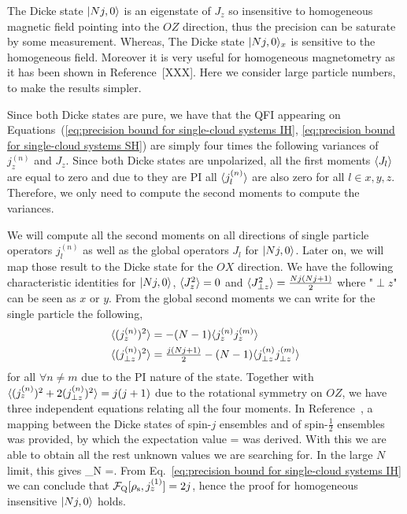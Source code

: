 The Dicke state $\vert Nj, 0 \rangle$ is an eigenstate of $J_z$ so insensitive to homogeneous magnetic field pointing into the $OZ$ direction, thus the precision can be saturate by some measurement.
Whereas, The Dicke state $\vert Nj, 0 \rangle_x$ is sensitive to the homogeneous field.
Moreover it is very useful for homogeneous magnetometry as it has been shown in Reference~[XXX].
Here we consider large particle numbers, to make the results simpler.

Since both Dicke states are pure, we have that
the QFI appearing on Equations~(\ref{eq:precision bound for single-cloud
systems IH}, \ref{eq:precision bound for single-cloud
systems SH}) are simply four times the following variances of $j_z^{(n)}$ and $J_z$.
Since both Dicke states are unpolarized, all the first moments $\langle J_l \rangle$ are equal to zero and due to they are PI all $\langle j_l^{(n)} \rangle$ are also zero for all $l\in x,y,z$.
Therefore, we only need to compute the second moments to compute the variances.


We will compute all the second moments on all directions of single particle operators $j_l^{(n)}$ as well as the global operators $J_l$ for $\vert Nj,0 \rangle$.
Later on, we will map those result to the Dicke state for the $OX$ direction.
We have the following characteristic identities for $\vert Nj,0 \rangle$, $\langle J_z^2 \rangle = 0$ and $\langle J_{\perp z}^2 \rangle = \frac{Nj(Nj+1)}{2}$ where "${\perp}{z}$" can be seen as $x$ or $y$.
From the global second moments we can write for the single particle the following,
\begin{align}
  \langle (j_z^{(n)})^2 \rangle &= -(N-1)\langle j_z^{(n)}j_z^{(m)} \rangle \\
  \langle (j_{\perp z}^{(n)})^2 \rangle &= \tfrac{j(Nj+1)}{2}-(N-1)\langle j_{\perp z}^{(n)}j_{\perp z}^{(m)} \rangle
\end{align}
for all $\forall n\neq m$ due to the PI nature of the state.
Together with $\langle (j_z^{(n)})^2+2(j_{\perp z}^{(n)})^2 \rangle = j(j+1)$ due to the rotational symmetry on $OZ$, we have three independent equations relating all the four moments.
In Reference~\cite{Urizar-Lanz2013}, a mapping between the Dicke states of spin-$j$ ensembles and of spin-$\frac{1}{2}$ ensembles was provided, by which the expectation value
\be
  = 
\ee
was derived.
With this we are able to obtain all the rest unknown values we are searching for.
In the large $N$ limit, this gives
\be
\label{eq:jz2 for dicke state large number of particles}
\lim_{N \to \infty} =.
\ee
From Eq.~\eqref{eq:precision bound for single-cloud
systems IH} we can conclude that $\mathcal{F}_{\text{Q}}[\rho_{\rm s},j_z^{(1)}]=2j$,
hence the proof for homogeneous insensitive $\vert Nj,0 \rangle$ holds.

